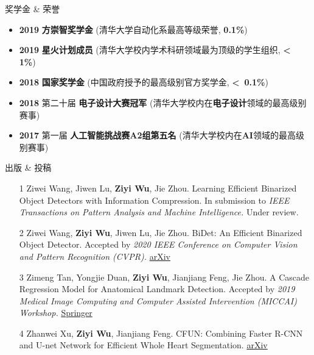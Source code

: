 \documentclass{resume} %
\begin{document}
\begin{rSection}{奖学金 \& 荣誉}

\begin{itemize}
    \item \textbf{2019 } \textbf{方崇智奖学金 } (清华大学自动化系最高等级荣誉, \textbf{0.1\%})
    \item \textbf{2019 } \textbf{星火计划成员 } (清华大学校内学术科研领域最为顶级的学生组织, \textbf{\textless \, 1\%})
    \item \textbf{2018 } \textbf{国家奖学金 } (中国政府授予的最高级别官方奖学金, \textbf{\textless \, 0.1\%})
    \item \textbf{2018 } 第二十届 \textbf{电子设计大赛冠军 } (清华大学校内在\textbf{电子设计}领域的最高级别赛事)
    \item \textbf{2017 } 第一届 \textbf{人工智能挑战赛A2组第五名 } (清华大学校内在\textbf{AI}领域的最高级别赛事)\newline
\end{itemize}

\end{rSection}
\begin{rSection}{出版 \& 投稿}

\begin{enumerate}
\item[1] Ziwei Wang, Jiwen Lu, \textbf{Ziyi Wu}, Jie Zhou. Learning Efficient Binarized Object Detectors with Information Compression. In submission to \textit{IEEE Transactions on Pattern Analysis and Machine Intelligence.} Under review.
\item[2] Ziwei Wang, \textbf{Ziyi Wu}, Jiwen Lu, Jie Zhou. BiDet: An Efficient Binarized Object Detector. Accepted by \textit{2020 IEEE Conference on Computer Vision and Pattern Recognition (CVPR).} \href{https://arxiv.org/abs/2003.03961}{arXiv}
\item[3] Zimeng Tan, Yongjie Duan, \textbf{Ziyi Wu}, Jianjiang Feng, Jie Zhou. A Cascade Regression Model for Anatomical Landmark Detection. Accepted by \textit{2019 Medical Image Computing and Computer Assisted Intervention (MICCAI) Workshop.} \href{https://link.springer.com/chapter/10.1007/978-3-030-39074-7_5}{Springer}
\item[4] Zhanwei Xu, \textbf{Ziyi Wu}, Jianjiang Feng. CFUN: Combining Faster R-CNN and U-net Network for Efficient Whole Heart Segmentation. \href{https://arxiv.org/abs/1812.04914}{arXiv}\newline
\end{enumerate}

\end{rSection}
\end{document}
